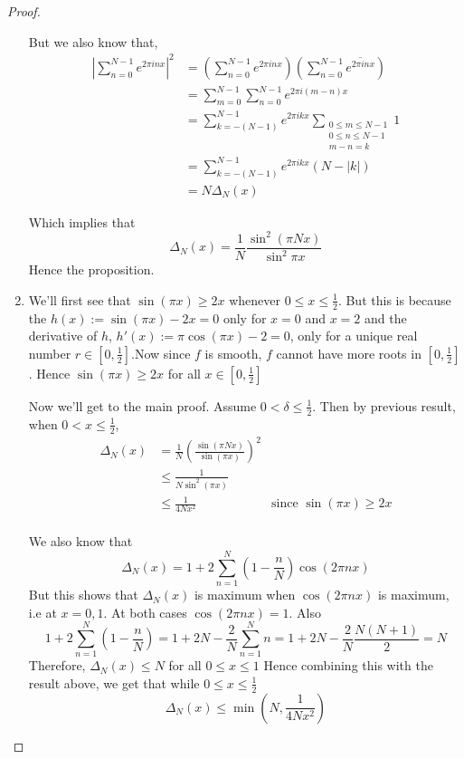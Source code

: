 \begin{proof}
\begin{enumerate}[label=(\alph*)]
        But we also know that,
        \begin{align*}
         \left|\sum_{n=0}^{N-1}e^{2 \pi inx}\right|^2 &= \left(\sum_{n=0}^{N-1}e^{2 \pi inx}\right)  \left(\sum_{n=0}^{N-1}\overline{e^{2 \pi inx}}\right) \\
            &= \sum_{m=0}^{N-1} \sum_{n=0}^{N-1} e^{2\pi i(m-n)x} \\
            &= \sum_{k = -(N-1)}^{N-1} e^{2\pi ikx} \sum_{\substack{0\le m \le N-1 \\ 0 \le n \le N-1 \\ m-n = k}}1 \\
            &= \sum_{k = -(N-1)}^{N-1} e^{2\pi ikx} (N - |k|) \\
            &= N\Delta_N(x)
        \end{align*}

        Which implies that 
        \begin{displaymath}
          \Delta_N(x) = \frac{1}{N}\frac{\sin^2(\pi Nx)}{\sin^2{\pi x}}
        \end{displaymath}
        Hence the proposition.
     
      \item 
        We'll first see that $\sin(\pi x) \ge 2x$ whenever $0\le x\le \frac{1}{2}$. 
        But this is because the $h(x) := \sin(\pi x) - 2x = 0$ only for $x=0$ and $x=2$ and the derivative of $h$, $h'(x) := \pi \cos(\pi x) - 2 = 0$, only for a unique real number $r\in [0, \frac{1}{2}]$.Now since $f$ is smooth, $f$ cannot have more roots in $[0, \frac{1}{2}]$. Hence $\sin(\pi x) \ge 2x$ for all $x \in [0, \frac{1}{2}]$

        Now we'll get to the main proof. Assume $0 < \delta \le \frac{1}{2}$. Then by previous result, when $0<x \le \frac{1}{2}$,
       \begin{align*}
         \Delta_N(x) &= \frac{1}{N}\left(\frac{\sin(\pi Nx)}{\sin(\pi x)}\right)^2 \\
                &\le \frac{1}{N\sin^2(\pi x)} \\
                &\le \frac{1}{4Nx^2} &\text{since } \sin(\pi x) \ge 2x \\
       \end{align*}

        We also know that $$\Delta_N(x) = 1+ 2 \sum_{n=1}^{N} \left(1-\frac{n}{N}\right)\cos(2\pi nx)$$
        But this shows that $\Delta_N(x)$ is maximum when $\cos(2\pi nx)$ is maximum, i.e at $x = 0, 1$. At both cases $\cos(2\pi nx) = 1$.
        Also $$1 + 2\sum_{n=1}^N \left(1-\frac{n}{N}\right) = 1 + 2N - \frac{2}{N}\sum_{n=1}^N n = 1+2N - \frac{2}{N}\frac{N(N+1)}{2} = N$$
        Therefore, $\Delta_N(x) \le N$ for all $0\le x \le 1$
        Hence combining this with the result above, we get that while $0\le x\le \frac{1}{2}$
        $$\Delta_N(x) \le \min{\left(N, \frac{1}{4Nx^2}\right)}$$


\end{enumerate}
\end{proof}
